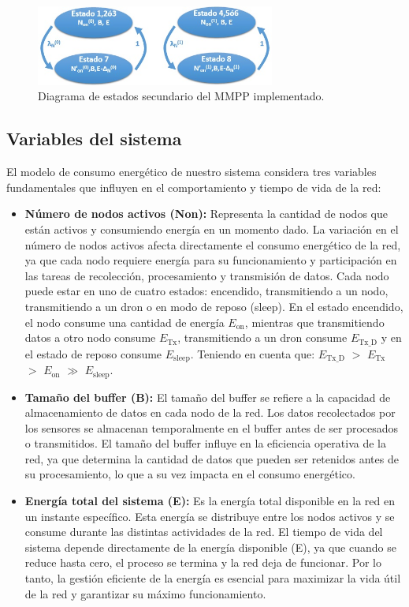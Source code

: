 \begin{figure}[H]
    \centering
    \includegraphics[width=0.7\textwidth]{imagenes/diagramammpp2.jpg}
    \caption{Diagrama de estados secundario del MMPP implementado.}
    \label{fig:diagramammpp2}
\end{figure}

\subsection{Variables del sistema}
El modelo de consumo energético de nuestro sistema considera tres variables fundamentales que influyen en el comportamiento y  tiempo de vida de la red:
\begin{itemize}
    \item \textbf{Número de nodos activos (Non):} Representa la cantidad de nodos que están activos y consumiendo energía en un momento dado. La variación en el número de nodos activos afecta directamente el consumo energético de la red, ya que cada nodo requiere energía para su funcionamiento y participación en las tareas de recolección, procesamiento y transmisión de datos. Cada nodo puede estar en uno de cuatro estados: encendido, transmitiendo a un nodo, transmitiendo a un dron o en modo de reposo (sleep). En el estado encendido, el nodo consume una cantidad de energía \(E_{\text{on}}\), mientras que transmitiendo datos a otro nodo consume \(E_{\text{Tx}}\), transmitiendo a un dron consume \(E_{\text{Tx\_D}}\) y en el estado de reposo consume  \(E_{\text{sleep}}\). Teniendo en cuenta que: \(E_{\text{Tx\_D}}\) $>$ \(E_{\text{Tx}}\) $>$ \(E_{\text{on}}\) $\gg$ \(E_{\text{sleep}}\).
    \item \textbf{Tamaño del buffer (B):} El tamaño del buffer se refiere a la capacidad de almacenamiento de datos en cada nodo de la red. Los datos recolectados por los sensores se almacenan temporalmente en el buffer antes de ser procesados o transmitidos. El tamaño del buffer influye en la eficiencia operativa de la red, ya que determina la cantidad de datos que pueden ser retenidos antes de su procesamiento, lo que a su vez impacta en el consumo energético.
    \item \textbf{Energía total del sistema (E):} Es la energía total disponible en la red en un instante específico. Esta energía se distribuye entre los nodos activos y se consume durante las distintas actividades de la red. El tiempo de vida del sistema depende directamente de la energía disponible (E), ya que cuando se reduce hasta cero, el proceso se termina y la red deja de funcionar. Por lo tanto, la gestión eficiente de la energía es esencial para maximizar la vida útil de la red y garantizar su máximo funcionamiento.
\end{itemize}

